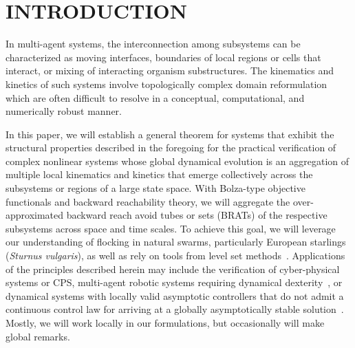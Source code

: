 \section{INTRODUCTION}
%

In multi-agent systems, the interconnection among subsystems can be characterized as moving interfaces, boundaries of local regions or cells that interact, or mixing of interacting organism substructures. The kinematics and kinetics of such  systems involve topologically complex domain reformulation which are often difficult to resolve in a conceptual, computational, and numerically robust manner.

In this paper, we will establish a general theorem for systems that exhibit the structural properties described in the foregoing for the practical verification of complex nonlinear systems whose global dynamical evolution is an aggregation of multiple local kinematics and kinetics that emerge collectively across the  subsystems or regions of a large state space. %
With Bolza-type objective functionals and backward reachability theory, we will aggregate the over-approximated  backward reach avoid tubes or sets (BRATs) of the respective subsystems across space and time scales.  To achieve this goal, we will leverage our understanding of flocking in natural swarms, particularly European starlings (\textit{Sturnus vulgaris}), as well as rely on tools from level set methods~\cite{SethianLSBook, OsherFronts}. Applications of the principles described herein may include the verification of cyber-physical systems or CPS, multi-agent robotic systems requiring dynamical dexterity~\cite{SeqCompKoditschek}, or  dynamical systems with locally valid asymptotic controllers that do not admit a continuous control law for arriving at a globally asymptotically stable solution~\cite[Theorem II]{Brockett83}.  Mostly, we will work locally in our formulations, but occasionally will make global remarks. 

